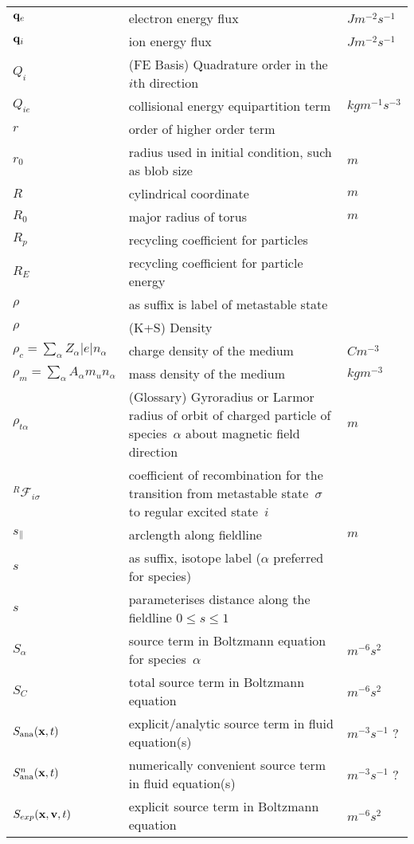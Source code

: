 \begin{longtable}{|p{3.0cm}|p{10.0cm}|p{3.0cm}|}
${\bf q}_e$ & electron energy flux  & $J m^{-2} s^{-1}$ \\
${\bf q}_i$ & ion energy flux  & $J m^{-2} s^{-1}$ \\
$Q_i$ &  (FE Basis) Quadrature order in the $i$th direction & \\
$Q_{ie}$ & collisional energy equipartition term  & $kg m^{-1} s^{-3}$ \\
$r$ & order of higher order term  & \\
$r_0$ & radius used in initial condition, such as blob size & $m$ \\
$R$ & cylindrical coordinate  & $m$ \\
$R_0$ & major radius of torus & $m$ \\
$R_p$ & recycling coefficient for particles & \\
$R_E$ & recycling coefficient for particle energy & \\
$\rho$ & as suffix is label of metastable state & \\
$\rho$ &  (K+S) Density & \\
$\rho_c=\sum_\alpha Z_\alpha |e| n_\alpha$ & charge density of the medium  & $C m^{-3}$ \\
$\rho_m=\sum_\alpha A_\alpha m_u n_\alpha$ & mass density of the medium  & $kg m^{-3}$ \\
$\rho_{t\alpha}$  & (Glossary) Gyroradius or Larmor radius of orbit of charged particle of species~$\alpha$ about magnetic field direction  & $m$ \\
$^R\mathcal{F}_{i\sigma}$ & coefficient of recombination for the transition from metastable state~$\sigma$ to regular excited state~$i$  & \\
$s_{\|}$ & arclength along fieldline  & $m$ \\
$s$ & as suffix, isotope label ($\alpha$ preferred for species) & \\
$s$ & parameterises distance along the fieldline $0\leq s \leq 1$ & \\
$S_\alpha$ & source term in Boltzmann equation for species~$\alpha$  & $m^{-6} s^2$ \\
$S_C$ & total source term in Boltzmann equation  & $m^{-6} s^2$ \\
$S_\mathrm{ana}({\bf x},t)$ & explicit/analytic source term in fluid equation(s)  & $m^{-3} s^{-1}$ ? \\
$S^n_\mathrm{ana}({\bf x},t)$ & numerically convenient source term in fluid equation(s)  & $m^{-3} s^{-1}$ ? \\
$S_{exp}({\bf x}, {\bf v},t)$ & explicit source term in Boltzmann equation  & $m^{-6} s^2$ \\

\end{longtable}
